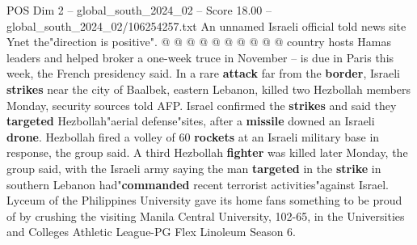 \begin{textsample}{POS Dim 2 – global\_south\_2024\_02 – Score 18.00 – global\_south\_2024\_02/106254257.txt}
An unnamed Israeli official told news site Ynet the"direction is positive". @ @ @ @ @ @ @ @ @ @ country hosts Hamas leaders and helped broker a one-week truce in November -- is due in Paris this week, the French presidency said.
In a rare \textbf{attack} far from the \textbf{border}, Israeli \textbf{strikes} near the city of Baalbek, eastern Lebanon, killed two Hezbollah members Monday, security sources told AFP.
Israel confirmed the \textbf{strikes} and said they \textbf{targeted} Hezbollah"aerial defense"sites, after a \textbf{missile} downed an Israeli \textbf{drone}.
Hezbollah fired a volley of 60 \textbf{rockets} at an Israeli military base in response, the group said.
A third Hezbollah \textbf{fighter} was killed later Monday, the group said, with the Israeli army saying the man \textbf{targeted} in the \textbf{strike} in southern Lebanon had"\textbf{commanded} recent terrorist activities"against Israel.
Lyceum of the Philippines University gave its home fans something to be proud of by crushing the visiting Manila Central University, 102-65, in the Universities and Colleges Athletic League-PG Flex Linoleum Season 6.

\end{textsample}

